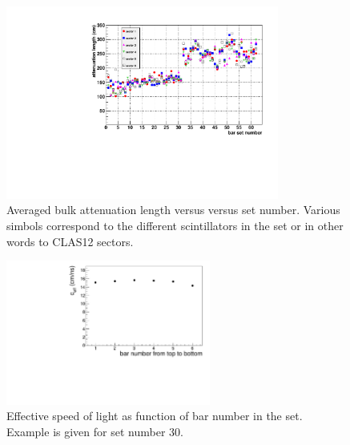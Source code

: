 \begin{figure}[]
\centering
\includegraphics[width=0.8\textwidth]{gleb/fig_gleb_att_length/att_vs_barnum.pdf}
\caption{Averaged bulk attenuation length versus versus set number. Various simbols correspond to the different scintillators in the set or in other words to CLAS12 sectors. \label{fig:att_vs_barnum}}
\end{figure}






\begin{figure}[]
\centering
\includegraphics[width=0.6\textwidth]{gleb/fig_gleb_att_length/c_eff.pdf}
\caption{Effective speed of light as function of bar number in the set. Example is given for set number 30. \label{fig:c_eff}}
\end{figure}
